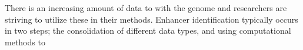                 

       
        

        There is an increasing amount of data to with the genome and researchers are striving to utilize these in their methods. Enhancer identification typically occurs in two steps; the consolidation of different data types, and using computational methods to  

